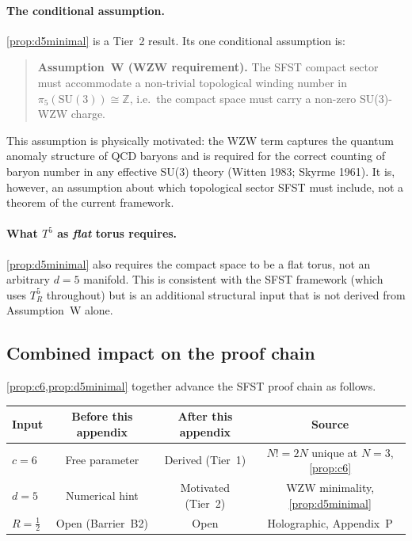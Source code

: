 \paragraph{The conditional assumption.}
\cref{prop:d5minimal} is a Tier~2 result.  Its one conditional
assumption is:

\begin{quote}
\textbf{Assumption~W (WZW requirement).}
The SFST compact sector must accommodate a non-trivial topological
winding number in $\pi_5(\mathrm{SU}(3))\cong\mathbb{Z}$, i.e.\ the
compact space must carry a non-zero SU(3)-WZW charge.
\end{quote}

This assumption is physically motivated: the WZW term captures the
quantum anomaly structure of QCD baryons and is required for the
correct counting of baryon number in any effective SU(3) theory
(Witten 1983; Skyrme 1961).  It is, however, an assumption about which
topological sector SFST must include, not a theorem of the current
framework.

\paragraph{What $T^5$ as \emph{flat} torus requires.}
\cref{prop:d5minimal} also requires the compact space to be a flat
torus, not an arbitrary $d=5$ manifold.  This is consistent with the
SFST framework (which uses $T^5_R$ throughout) but is an additional
structural input that is not derived from Assumption~W alone.

\subsection{Combined impact on the proof chain}
\label{ssec:combinedImpact}

\cref{prop:c6,prop:d5minimal} together advance the SFST proof chain
as follows.

\begin{center}
\renewcommand{\arraystretch}{1.3}
\begin{tabular}{lccc}
\toprule
Input & Before this appendix & After this appendix & Source \\
\midrule
$c = 6$ & Free parameter & Derived (Tier~1) &
  $N!=2N$ unique at $N=3$, \cref{prop:c6} \\
$d = 5$ & Numerical hint & Motivated (Tier~2) &
  WZW minimality, \cref{prop:d5minimal} \\
$R = \tfrac{1}{2}$ & Open (Barrier~B2) & Open & Holographic, Appendix~P \\
\bottomrule
\end{tabular}
\end{center}

